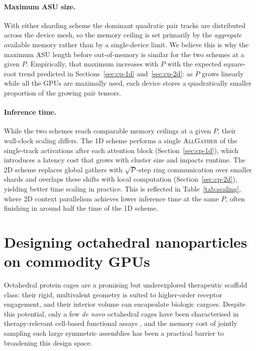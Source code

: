 \paragraph{Maximum ASU size.}
With either sharding scheme the dominant quadratic pair tracks are distributed
across the device mesh, so the memory ceiling is set primarily by the
\emph{aggregate} available memory rather than by a single-device limit. We believe
this is why the maximum ASU length before out-of-memory is similar for the two
schemes at a given $P$. Empirically, that maximum increases with $P$ with the
expected square-root trend predicted in
Sections~\ref{sec:cp-1d} and~\ref{sec:cp-2d}: as $P$ grows linearly while all the
GPUs are maximally used, each device stores a quadratically smaller proportion of
the growing pair tensors.

\paragraph{Inference time.}
While the two schemes reach comparable memory ceilings at a given $P$, their
wall-clock scaling differs. The 1D scheme performs a single \textsc{AllGather} of
the single-track activations after each attention block
(Section~\ref{sec:cp-1d}), which introduces a latency cost that grows with cluster
size and impacts runtime. The 2D scheme replaces global gathers with $\sqrt{P}$-step
ring communication over smaller shards and overlaps these shifts with local
computation (Section~\ref{sec:cp-2d}), yielding better time scaling in practice.
This is reflected in Table~\ref{tab:scaling}, where 2D context parallelism
achieves lower inference time at the same $P$, often finishing in around half the
time of the 1D scheme.

\section{Designing octahedral nanoparticles on commodity GPUs}
\label{sec:octahedral}

Octahedral protein cages are a promising but underexplored therapeutic scaffold
class: their rigid, multivalent geometry is suited to higher-order receptor
engagement, and their interior volume can encapsulate biologic cargoes. Despite
this potential, only a few \emph{de novo} octahedral cages have been characterised
in therapy-relevant cell-based functional assays
\parencite{divine_designed_2021,yang_computational_2024}, and the memory cost of
jointly sampling such large symmetric assemblies has been a practical barrier to
broadening this design space.

